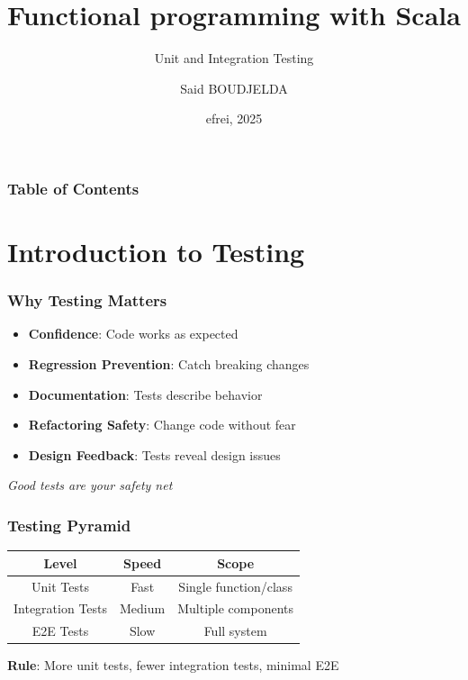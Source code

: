 \documentclass{beamer}
\title[Testing in Scala]
{Functional programming with Scala}
\subtitle{Unit and Integration Testing}
\author[Said BOUDJELDA]
{Said BOUDJELDA}
\institute[efrei]
{
  Senior Software Engineer @SCIAM\\
  GitHub @bmscomp
}
\date[efrei 2025]
{efrei, 2025}
\begin{document}
\frame{\titlepage}

\begin{frame}
\frametitle{Table of Contents}
\tableofcontents
\end{frame}

\section{Introduction to Testing}

\begin{frame}
\frametitle{Why Testing Matters}

\begin{itemize}
  \item \textbf{Confidence}: Code works as expected
  \item \textbf{Regression Prevention}: Catch breaking changes
  \item \textbf{Documentation}: Tests describe behavior
  \item \textbf{Refactoring Safety}: Change code without fear
  \item \textbf{Design Feedback}: Tests reveal design issues
\end{itemize}

\vspace{0.3cm}
\textit{Good tests are your safety net}

\end{frame}

\begin{frame}
\frametitle{Testing Pyramid}

\begin{center}
\begin{tabular}{|c|c|c|}
\hline
\textbf{Level} & \textbf{Speed} & \textbf{Scope} \\
\hline
Unit Tests & Fast & Single function/class \\
\hline
Integration Tests & Medium & Multiple components \\
\hline
E2E Tests & Slow & Full system \\
\hline
\end{tabular}
\end{center}

\vspace{0.5cm}
\textbf{Rule}: More unit tests, fewer integration tests, minimal E2E

\end{frame}
\end{document}

